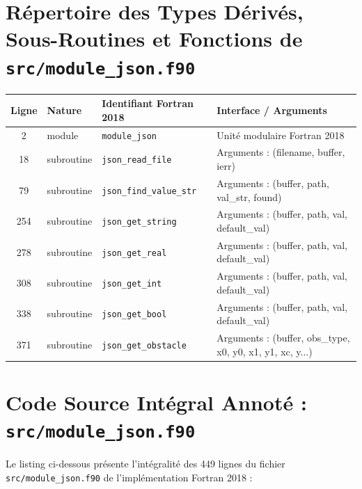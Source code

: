 \documentclass[10pt,a4paper,oneside]{book}
\begin{document}
\section{Répertoire des Types Dérivés, Sous-Routines et Fonctions de \texttt{src/module\_json.f90}}
\begin{center}\small
\begin{tabular}{clll}
\toprule
\textbf{Ligne} & \textbf{Nature} & \textbf{Identifiant Fortran 2018} & \textbf{Interface / Arguments} \\
\midrule
2 & module & \texttt{module\_json} & Unité modulaire Fortran 2018 \\
18 & subroutine & \texttt{json\_read\_file} & Arguments : (filename, buffer, ierr) \\
79 & subroutine & \texttt{json\_find\_value\_str} & Arguments : (buffer, path, val\_str, found) \\
254 & subroutine & \texttt{json\_get\_string} & Arguments : (buffer, path, val, default\_val) \\
278 & subroutine & \texttt{json\_get\_real} & Arguments : (buffer, path, val, default\_val) \\
308 & subroutine & \texttt{json\_get\_int} & Arguments : (buffer, path, val, default\_val) \\
338 & subroutine & \texttt{json\_get\_bool} & Arguments : (buffer, path, val, default\_val) \\
371 & subroutine & \texttt{json\_get\_obstacle} & Arguments : (buffer, obs\_type, x0, y0, x1, y1, xc, y...) \\
\bottomrule
\end{tabular}
\end{center}

\section{Code Source Intégral Annoté : \texttt{src/module\_json.f90}}
Le listing ci-dessous présente l'intégralité des 449 lignes du fichier \texttt{src/module\_json.f90} de l'implémentation Fortran 2018 :
\end{document}
